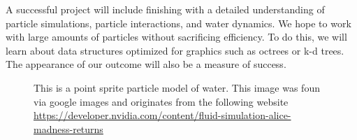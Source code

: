 \documentclass[dvips,12pt]{article}
\begin{document}
 \newline

A successful project will include finishing with a detailed understanding of particle simulations,
particle interactions, and water dynamics. We hope to work with large amounts of particles without
sacrificing efficiency. To do this, we will learn about data structures optimized for graphics 
such as octrees or k-d trees. The appearance of our outcome will also be a measure of success.


\begin{figure}
\begin{center}
\end{center}

\caption{This is a point sprite particle model of water. This image was foun via
google images and originates from the following website \url{https://developer.nvidia.com/content/fluid-simulation-alice-madness-returns}
\label{m42}}

\end{figure}
\end{document}
